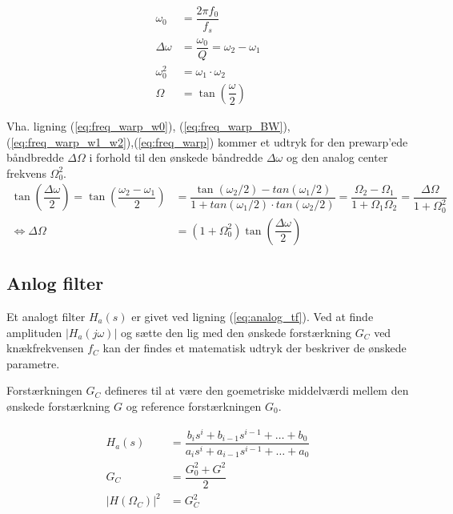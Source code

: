     \begin{align}
    \omega_0 &= \dfrac{2 \pi f_0}{f_s} \label{eq:freq_warp_w0}\\
    \Delta \omega &= \dfrac{\omega_0}{Q} = \omega_2 - \omega_1 \label{eq:freq_warp_BW} \\ 
    \omega_0^2 &= \omega_1 \cdot \omega_2 \label{eq:freq_warp_w1_w2} \\
    \Omega &= \tan\left(  \dfrac{\omega}{2} \right) \label{eq:freq_warp}
    \end{align}
        
    Vha. ligning (\ref{eq:freq_warp_w0}), (\ref{eq:freq_warp_BW}),(\ref{eq:freq_warp_w1_w2}),(\ref{eq:freq_warp}) 
    kommer et udtryk for den prewarp'ede båndbredde $\Delta \Omega$ i 
    forhold til den ønskede båndredde $\Delta \omega$ og den analog center frekvens $\Omega_0^2$.
\begin{align}
    \tan \left( \dfrac{\Delta \omega}{2} \right) = \tan \left( \dfrac{\omega_2 - \omega_1}{2} \right) &= \dfrac{\tan(\omega_2/2) - tan(\omega_1/2)}{1 + tan(\omega_1/2) \cdot tan(\omega_2/2)} = \dfrac{\Omega_2 - \Omega_1}{1 + \Omega_1 \Omega_2} = \dfrac{\Delta \Omega}{1 + \Omega_0^2}\\
    \iff \Delta \Omega &= (1 + \Omega_0^2) \tan \left( \dfrac{\Delta \omega}{2} \right)
\end{align}

    \subsection{Anlog filter }

    Et analogt filter $H_a(s)$ er givet ved ligning (\ref{eq:analog_tf}). Ved at finde amplituden $|H_a (j\omega)|$ og sætte den 
    lig med den ønskede forstærkning $G_C$ ved knækfrekvensen $f_C$ kan der findes et matematisk udtryk der beskriver de ønskede parametre.
    
    Forstærkningen $G_C$ defineres til at være den goemetriske middelværdi mellem den ønskede forstærkning $G$ og reference forstærkningen $G_0$.

    \begin{align}
        H_a(s) &= \dfrac{b_i s^i + b_{i-1} s^{i-1}+ \dots + b_0 }{a_i s^i + a_{i-1} s^{i-1} +  \dots +a_0 }
        \label{eq:analog_tf} \\
        G_C &= \dfrac{G_0^2 + G^2}{2} \label{eq:analog_gc_def} \\
        |H(\Omega_C)|^2 &= G_C^2 \label{eq:analog_amp}
    \end{align}
    
